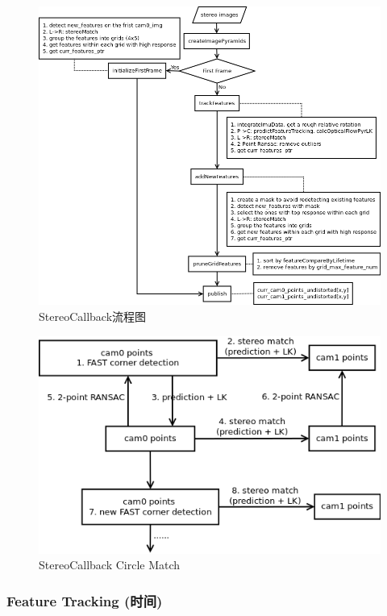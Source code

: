 \documentclass[12pt,a4paper]{article}
\begin{document}
\begin{figure}[H]
\centering
\includegraphics[scale=0.6]{images/stereo_cb.png}
\caption{StereoCallback流程图}
\end{figure}

\begin{figure}[H]
	\centering
	\includegraphics[scale=0.6]{images/smsckf_circlematch.png}
	\caption{StereoCallback Circle Match}
\end{figure}

\subsubsection{Feature Tracking (时间)}
\end{document}
